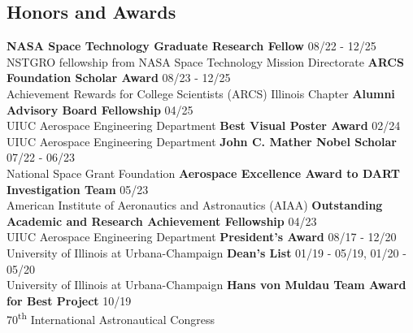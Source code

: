 \documentclass[margin,line]{res}
\newlength{\myitemspacing}
\begin{document}
\begin{resume}
\section{\sc Honors and Awards}
{\bf NASA Space Technology Graduate Research Fellow} \hfill 08/22  - 12/25\\
NSTGRO fellowship from NASA Space Technology Mission Directorate
\vspace{\myitemspacing}\newline
{\bf ARCS Foundation Scholar Award} \hfill 08/23 - 12/25\\
Achievement Rewards for College Scientists (ARCS) Illinois Chapter
\vspace{\myitemspacing}\newline
{\bf Alumni Advisory Board Fellowship} \hfill 04/25\\
UIUC Aerospace Engineering Department
\vspace{\myitemspacing}\newline
{\bf Best Visual Poster Award} \hfill 02/24\\
UIUC Aerospace Engineering Department
\vspace{\myitemspacing}\newline
{\bf John C. Mather Nobel Scholar} \hfill 07/22 - 06/23\\
National Space Grant Foundation
\vspace{\myitemspacing}\newline
{\bf Aerospace Excellence Award to DART Investigation Team} \hfill 05/23\\
American Institute of Aeronautics and Astronautics (AIAA)
\vspace{\myitemspacing}\newline
{\bf Outstanding Academic and Research Achievement Fellowship} \hfill 04/23\\
UIUC Aerospace Engineering Department
\vspace{\myitemspacing}\newline
{\bf President's Award} \hfill 08/17 - 12/20\\
University of Illinois at Urbana-Champaign
\vspace{\myitemspacing}\newline
{\bf Dean's List} \hfill 01/19 - 05/19, 01/20 - 05/20\\
University of Illinois at Urbana-Champaign
\vspace{\myitemspacing}\newline
{\bf Hans von Muldau Team Award for Best Project} \hfill 10/19\\
70\textsuperscript{th} International Astronautical Congress


\end{resume}
\end{document}
